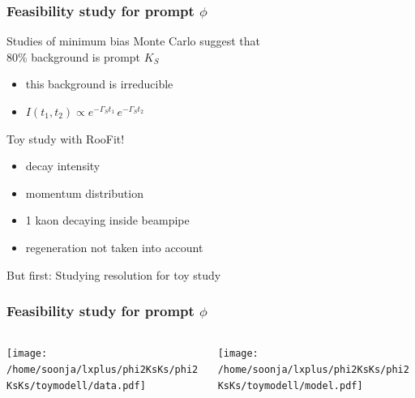 \documentclass{beamer}
\begin{document}
\LogoOff
\begin{frame}[fragile]
\frametitle{Feasibility study for prompt $\phi$}

Studies of minimum bias Monte Carlo suggest that \\80\% background is prompt $K_S$
\begin{itemize}
\item this background is irreducible
\item $I(t_1,t_2) \propto e^{-\Gamma_St_1} \,e^{-\Gamma_St_2}$
\end{itemize}
\vspace*{6pt}
Toy study with RooFit!
\begin{itemize}
\item decay intensity
\item momentum distribution
\item 1 kaon decaying inside beampipe
\item regeneration not taken into account
\end{itemize}
\vspace*{6pt}
But first: Studying resolution for toy study
\end{frame}




\begin{frame}[fragile]
\frametitle{Feasibility study for prompt $\phi$}

\begin{columns}
\begin{column}{.5\textwidth}
\texttt{[image: /home/soonja/lxplus/phi2KsKs/phi2KsKs/toymodell/data.pdf]}
\end{column}

\begin{column}{.5\textwidth}
\texttt{[image: /home/soonja/lxplus/phi2KsKs/phi2KsKs/toymodell/model.pdf]}
\end{column}
\end{columns}

\end{frame}
\end{document}
